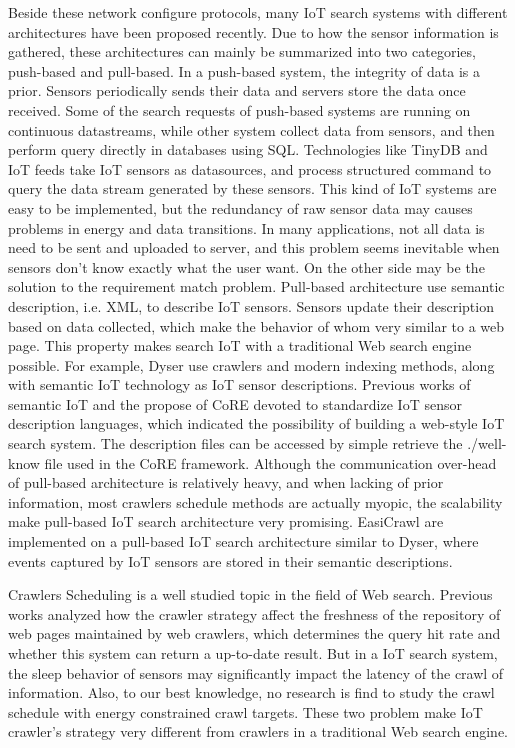 \documentclass[conference]{IEEEtran}
\begin{document}
Beside these network configure protocols, many IoT search systems with different architectures have been proposed recently.
Due to how the sensor information is gathered, these architectures can mainly be summarized into two categories, push-based and pull-based.
In a push-based system, the integrity of data is a prior.
Sensors periodically sends their data and servers store the data once received. Some of the search requests of push-based systems are running on continuous datastreams, while other system collect data from sensors, and then perform query directly in databases using SQL. 
Technologies like TinyDB\cite{TinyDB} and IoT feeds\cite{Whitehouse2006} take IoT sensors as datasources, and process structured command to query the data stream generated by these sensors. 
This kind of IoT systems are easy to be implemented, but the redundancy of raw sensor data may causes problems in energy and data transitions.
In many applications, not all data is need to be sent and uploaded to server, and this problem seems inevitable when sensors don't know exactly what the user want.
On the other side may be the solution to the requirement match problem.
Pull-based architecture use semantic description, i.e. XML, to describe IoT sensors. Sensors update their description based on data collected, which make the behavior of whom very similar to a web page. This property makes search IoT with a traditional Web search engine possible. For example, Dyser\cite{Dyser} use crawlers and modern indexing methods, along with semantic IoT technology as IoT sensor descriptions. Previous works of semantic IoT\cite{Compton2012} and the propose of CoRE\cite{CoREWorkingGroup2012} devoted to standardize IoT sensor description languages, which indicated the possibility of building a web-style IoT search system. The description files can be accessed by simple retrieve the ./well-know file used in the CoRE framework. 
Although the communication over-head of pull-based architecture is relatively heavy, and when lacking of prior information, most crawlers schedule methods are actually myopic, the scalability make pull-based IoT search architecture very promising.
EasiCrawl are implemented on a pull-based IoT search architecture similar to Dyser\cite{Dyser}, where events captured by IoT sensors are stored in their semantic descriptions.

Crawlers Scheduling is a well studied topic in the field of Web search. Previous works\cite{Cho2000}\cite{Wolf2002}\cite{Challenger2004} analyzed how the crawler strategy affect the freshness of the repository of web pages maintained by web crawlers, which determines the query hit rate and whether this system can return a up-to-date result. 
But in a IoT search system, the sleep behavior of sensors may significantly impact the latency of the crawl of information.
Also, to our best knowledge, no research is find to study the crawl schedule with energy constrained crawl targets.
These two problem make IoT crawler's strategy very different from crawlers in a traditional Web search engine. 
\end{document}
